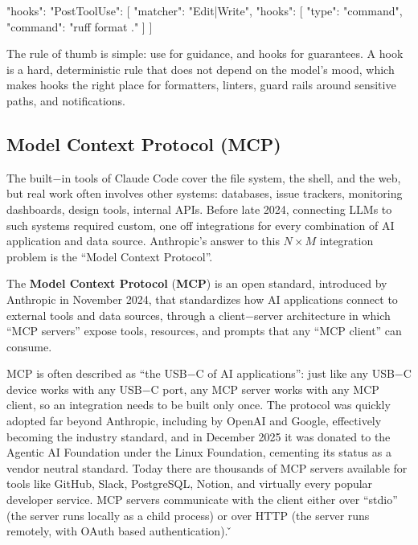 \begin{block}
{
  "hooks": {
    "PostToolUse": [
      {
        "matcher": "Edit|Write",
        "hooks": [
          {
            "type": "command",
            "command": "ruff format ."
          }
        ]
      }
    ]
  }
}
\end{block}

The rule of thumb is simple: use  for guidance, and hooks for guarantees. A hook is a hard,
deterministic rule that does not depend on the model's mood, which makes hooks the right place for formatters,
linters, guard rails around sensitive paths, and notifications.

\subsection{Model Context Protocol (MCP)}

The built$-$in tools of Claude Code cover the file system, the shell, and the web, but real work often involves other
systems: databases, issue trackers, monitoring dashboards, design tools, internal APIs. Before late 2024, connecting
LLMs to such systems required custom, one off integrations for every combination of AI application and data source.
Anthropic's answer to this $N \times M$ integration problem is the ``Model Context Protocol''.

The \textbf{Model Context Protocol} (\textbf{MCP}) is an open standard, introduced by Anthropic in November 2024,
that standardizes how AI applications connect to external tools and data sources, through a client$-$server
architecture in which ``MCP servers'' expose tools, resources, and prompts that any ``MCP client'' can consume.
\ed

MCP is often described as ``the USB$-$C of AI applications'': just like any USB$-$C device works with any USB$-$C
port, any MCP server works with any MCP client, so an integration needs to be built only once. The protocol was
quickly adopted far beyond Anthropic, including by OpenAI and Google, effectively becoming the industry standard, and
in December 2025 it was donated to the Agentic AI Foundation under the Linux Foundation, cementing its status as a
vendor neutral standard. Today there are thousands of MCP servers available for tools like GitHub, Slack, PostgreSQL,
Notion, and virtually every popular developer service. MCP servers communicate with the client either over ``stdio'' (the server runs locally as
a child process) or over HTTP (the server runs remotely, with OAuth based authentication). \v

